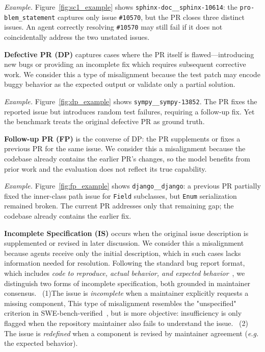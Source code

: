 \documentclass[sigconf, review, anonymous]{acmart}
\newcommand{\eg}{\textit{e.g.}\xspace}
\begin{document}
  \emph{Example.} Figure~\ref{fig:sc1_example} shows
  \texttt{sphinx-doc\_\_sphinx-10614}: the \texttt{pro-\allowbreak blem\_statement}
  captures only issue \texttt{\#10570}, but the PR closes                     
  three distinct issues. An agent correctly resolving \texttt{\#10570} may still
  fail if it does not coincidentally address the two unstated issues. 


    \textbf{Defective PR (DP)} captures cases where the PR itself is flawed---introducing new bugs or providing an incomplete fix which requires subsequent corrective work. We consider this a type of misalignment because the test patch may encode buggy behavior as the expected output or validate only a partial solution.

    \emph{Example.} Figure~\ref{fig:dp_example} shows \texttt{sympy\_\_sympy-13852}. The PR fixes the reported issue but introduces random test failures, requiring a follow‑up fix. Yet the benchmark treats the original defective PR as ground truth.


\textbf{Follow-up PR (FP)} is the converse of DP: the PR supplements
  or fixes a previous PR for the same issue. We consider this a                         
  misalignment because the codebase already contains the earlier PR's                      
  changes, so the model benefits from prior work and the evaluation does
  not reflect its true capability. 

  \emph{Example.} Figure~\ref{fig:fp_example} shows                                        
  \texttt{django\_\_django}: a previous PR partially fixed the                      
  inner-class path issue for \texttt{Field} subclasses, but                                
  \texttt{Enum} serialization remained broken. The current PR addresses                  
  only that remaining gap; the codebase already contains the earlier                   
  fix.


\textbf{Incomplete Specification (IS)} occurs when the original issue
  description is supplemented or revised in later discussion. We
  consider this a misalignment because agents receive only the initial
  description, which in such cases lacks information needed for
  resolution. Following the standard bug report format, which includes
\textit{code to reproduce, actual behavior, and expected
behavior}~\cite{bettenburg_what_2008,issuetemp1,issuetemp2,issuetemp3,issuetemp4},
we distinguish two forms of incomplete specification, both grounded
in maintainer consensus. ~(1)The issue is \textit{incomplete} when a
maintainer explicitly requests a missing component, This type of misalignment resembles the "unspecified" criterion in SWE-bench-verified~\cite{annotation_instruction}, but is more objective: insufficiency is only flagged when the repository maintainer also fails to understand the issue. ~(2) The issue is
\textit{redefined} when a component is revised by maintainer
agreement (\eg the expected behavior). 
  
\end{document}
